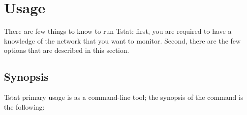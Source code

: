 \documentclass[11pt]{article}
\begin{document}
\section{Usage\label{Usage}}


There are few things to know to run Tstat: first, you are required to have a
knowledge of the network that you want to monitor. 
Second, there are the few options that are described in this section.

\subsection{Synopsis\label{Synopsis}}


Tstat primary usage is as a command-line tool; the synopsis of 
the command is the following:
\end{document}
